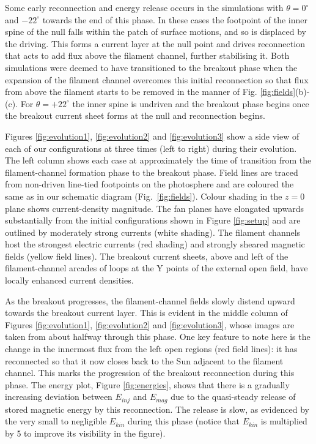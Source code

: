 \documentclass[twocolumn]{aastex6}
\begin{document}
{Some early reconnection and energy release occurs in the simulations with $\theta = 0^\circ$ and $-22^\circ$ towards the end of this phase. In these cases the footpoint of the inner spine of the null falls within the patch of surface motions, and so is displaced by the driving. This forms a current layer at the null point and drives reconnection that acts to add flux above the filament channel, further stabilising it. Both simulations were deemed to have transitioned to the breakout phase when the expansion of the filament channel overcomes this initial reconnection so that flux from above the filament starts to be removed in the manner of Fig. \ref{fig:fields}(b)-(c). For $\theta = +22^\circ$ the inner spine is undriven and the breakout phase begins once the breakout current sheet forms at the null and reconnection begins. }

Figures \ref{fig:evolution1}, \ref{fig:evolution2} and \ref{fig:evolution3} show a side view of each of our configurations at three times (left to right) during their evolution. The left column shows each case at approximately the time of transition from the filament-channel formation phase to the breakout phase. Field lines are traced from non-driven line-tied footpoints on the photosphere and are coloured the same as in our schematic diagram (Fig.\ \ref{fig:fields}). Colour shading in the $z=0$ plane shows current-density magnitude. The fan planes have elongated upwards substantially from the initial configurations shown in Figure \ref{fig:setup} and are outlined by moderately strong currents (white shading). The filament channels host the strongest electric currents (red shading) and strongly sheared magnetic fields (yellow field lines). The breakout current sheets, above and left of the filament-channel arcades of loops at the Y points of the external open field, have locally enhanced current densities.

As the breakout progresses, the filament-channel fields slowly distend upward towards the breakout current layer. This is evident in the middle column of Figures \ref{fig:evolution1}, \ref{fig:evolution2} and \ref{fig:evolution3}, whose images are taken from about halfway through this phase. One key feature to note here is the change in the innermost flux from the left open regions (red field lines): it has reconnected so that it now closes back to the Sun adjacent to the filament channel. This marks the progression of the breakout reconnection during this phase. The energy plot, Figure \ref{fig:energies}, shows that there is a gradually increasing deviation between $E_{inj}$ and $E_{mag}$ due to the quasi-steady release of stored magnetic energy by this reconnection. The release is slow, as evidenced by the very small to negligible $E_{kin}$ during this phase (notice that $E_{kin}$ is multiplied by 5 to improve its visibility in the figure).
\end{document}
